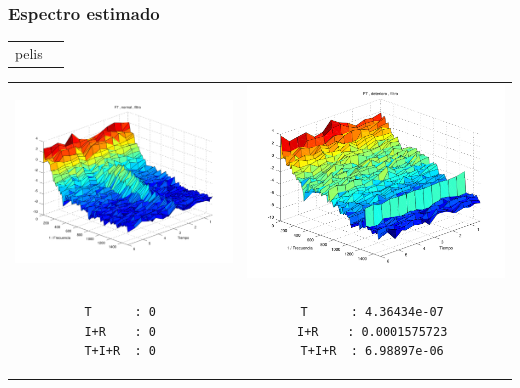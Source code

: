 \documentclass[11pt]{beamer}
\begin{document}

\begin{frame}[fragile]\frametitle{Espectro estimado}

\begin{center}
\begin{tabular}{cc}
pelis
\end{tabular} 
\end{center}

\end{frame}


\begin{frame}[fragile]
\begin{tabular}{cc}
\includegraphics[width=0.5\linewidth]{./img_old/n7f.pdf} 
&
\includegraphics[width=0.5\linewidth]{./img_old/d7f.pdf} 
\\
\begin{lstlisting}
T      : 0 
I+R    : 0 
T+I+R  : 0 
\end{lstlisting}
&
\begin{lstlisting}
T      : 4.36434e-07 
I+R    : 0.0001575723 
T+I+R  : 6.98897e-06 
\end{lstlisting}
\end{tabular}
\end{frame}
\end{document}
